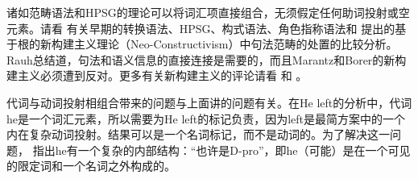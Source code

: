   诸如范畴语法和HPSG的理论可以将词汇项直接组合，无须假定任何助词投射或空元素。请看 有关早期的转换语法、HPSG\indexhpsgc、构式语法\indexcxgc、角色指称语法和 \citet{Chomsky2013a}提出的基于根的新构建主义理论（Neo-Constructivism）中句法范畴的处置的比较分析。Rauh总结道，句法和语义信息的直接连接是需要的，而且Marantz和Borer的新构建主义必须遭到反对。更多有关新构建主义的评论请看 和 。

代词与动词投射相组合带来的问题与上面讲的问题有关。在He left的分析中，代词he是一个词汇元素，所以需要为He left的标记负责，因为left是最简方案中的一个内在复杂动词投射。结果可以是一个名词标记，而不是动词的。为了解决这一问题， \citet[]{Chomsky2013a}指出he有一个复杂的内部结构：“也许是D-pro”，即he（可能）是在一个可见的限定词和一个名词之外构成的。

